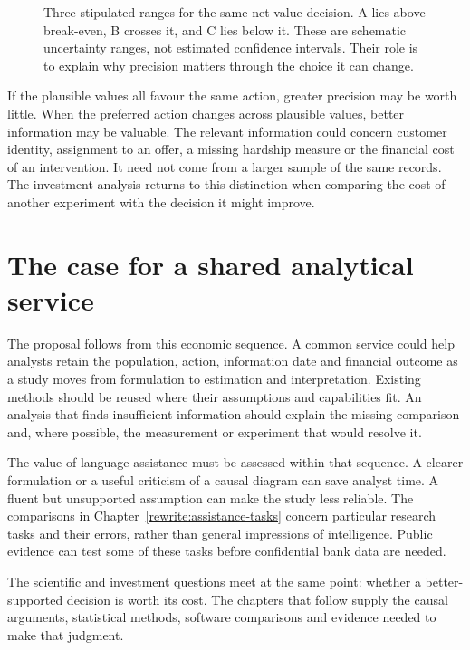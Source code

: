 \begin{figure}[htbp]\centering
{}
\caption{Three stipulated ranges for the same net-value decision. A lies above
break-even, B crosses it, and C lies below it. These are schematic uncertainty
ranges, not estimated confidence intervals. Their role is to explain why
precision matters through the choice it can change.}
\label{reading:uncertainty}
\end{figure}

If the plausible values all favour the same action, greater precision may be
worth little. When the preferred action changes across plausible values, better
information may be valuable. The relevant information could concern customer
identity, assignment to an offer, a missing hardship measure or the financial
cost of an intervention. It need not come from a larger sample of the same
records. The investment analysis returns to this distinction when comparing
the cost of another experiment with the decision it might improve.

\section{The case for a shared analytical service}

The proposal follows from this economic sequence. A common service could help
analysts retain the population, action, information date and financial outcome
as a study moves from formulation to estimation and interpretation. Existing
methods should be reused where their assumptions and capabilities fit. An
analysis that finds insufficient information should explain the missing
comparison and, where possible, the measurement or experiment that would
resolve it.

The value of language assistance must be assessed within that sequence. A
clearer formulation or a useful criticism of a causal diagram can save analyst
time. A fluent but unsupported assumption can make the study less reliable.
The comparisons in Chapter~\ref{rewrite:assistance-tasks} concern particular
research tasks and their errors, rather than general impressions of intelligence. Public evidence
can test some of these tasks before confidential bank data are needed.

The scientific and investment questions meet at the same point: whether a
better-supported decision is worth its cost. The chapters that follow supply
the causal arguments, statistical methods, software comparisons and evidence
needed to make that judgment.
